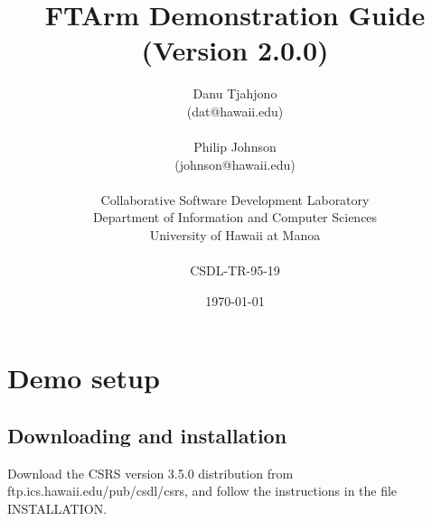 





\title {FTArm Demonstration Guide \\
{\normalsize (Version 2.0.0)}}

\author 
{Danu Tjahjono \\
 (dat@hawaii.edu) \\
 \\
Philip Johnson \\
(johnson@hawaii.edu)\\
\\
Collaborative Software Development Laboratory\\
Department of Information and Computer Sciences\\
University of Hawaii at Manoa\\
\\
CSDL-TR-95-19}
\date \today
\maketitle
\newpage
\tableofcontents
\newpage


\section{Demo setup}
\subsection {Downloading and installation}
 Download the CSRS version 3.5.0 distribution from 
 ftp.ics.hawaii.edu/pub/csdl/csrs, and follow the
  instructions in the file INSTALLATION.  

